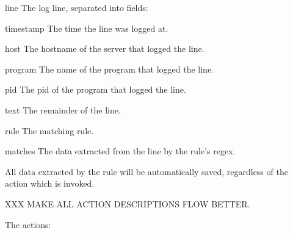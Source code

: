 \begin{eqlist}

    \item [line] The log line, separated into fields:

        \begin{eqlist}

            \item [timestamp] The time the line was logged at.

            \item [host] The hostname of the server that logged the line.

            \item [program] The name of the program that logged the line.

            \item [pid] The \gls{pid} of the program that logged the line.

            \item [text] The remainder of the line.

        \end{eqlist}

    \item [rule] The matching rule.

    \item [matches] The data extracted from the line by the rule's regex.

\end{eqlist}

All data extracted by the rule will be automatically saved, regardless of
the action which is invoked.

XXX MAKE ALL ACTION DESCRIPTIONS FLOW BETTER\@.  

The actions:

